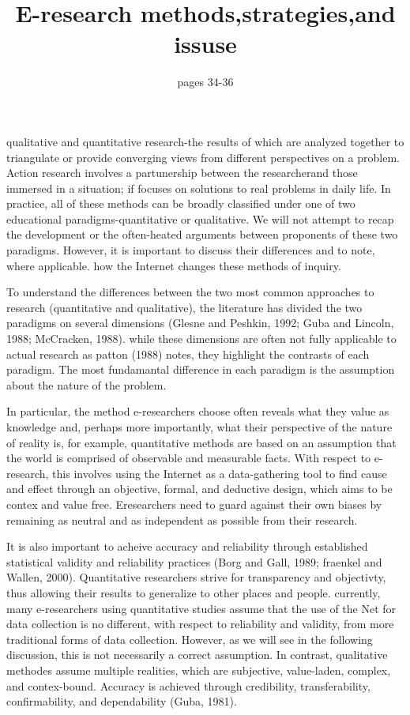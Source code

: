 \documentclass[12pt]{beamer}
\author{pages 34-36}
\title{E-research methods,strategies,and issuse}
\begin{document}
\frame{\maketitle}
\begin{frame}
qualitative and quantitative research-the results of which are analyzed together to triangulate or provide converging views from different perspectives on a problem. Action research involves a partunership between the researcherand those immersed in a situation; if focuses on solutions to real problems in daily life. In practice, all of these methods can be broadly classified under one of two educational paradigms-quantitative or qualitative. We will not attempt to recap the development or the often-heated arguments between proponents of these two paradigms. However, it is important to discuss their differences and to note, where applicable. how the Internet changes these methods of inquiry.
\end{frame}
\begin{frame}
 To understand the differences between the two most common approaches to research (quantitative and qualitative), the literature has divided the two paradigms on several dimensions (Glesne and Peshkin, 1992; Guba and Lincoln, 1988; McCracken, 1988).
 while these dimensions are often not fully applicable to actual research as patton (1988) notes, they highlight the contrasts of each paradigm. The most fundamantal difference in each paradigm is the assumption about the nature of the problem.
\end{frame}
\begin{frame}
 In particular, the method e-researchers choose often reveals what they value as knowledge and, perhaps more importantly, what their perspective of the nature of reality is, for example, quantitative methods are based on an assumption that the world is comprised of observable and measurable facts.
  With respect to e-research, this involves using the Internet as a data-gathering tool to find cause and effect through an objective, formal, and deductive design, which aims to be contex and value free. Eresearchers need to guard against their own biases by remaining as neutral and as independent as possible from their research.
\end{frame}
\begin{frame}
It is also important to acheive accuracy and reliability through established statistical validity and reliability practices (Borg and Gall, 1989; fraenkel and Wallen, 2000). Quantitative researchers strive for transparency and objectivty, thus allowing their results to generalize to other places and people. currently, many e-researchers using quantitative studies assume that the use of the Net for data collection is no different, with respect to reliability and validity, from more traditional forms of data collection. However, as we will see in the following discussion, this is not necessarily a correct assumption.
In contrast, qualitative methodes assume multiple realities, which are subjective, value-laden, complex, and contex-bound. Accuracy is achieved through credibility, transferability, confirmability, and dependability (Guba, 1981).
\end{frame}
\end{document}
